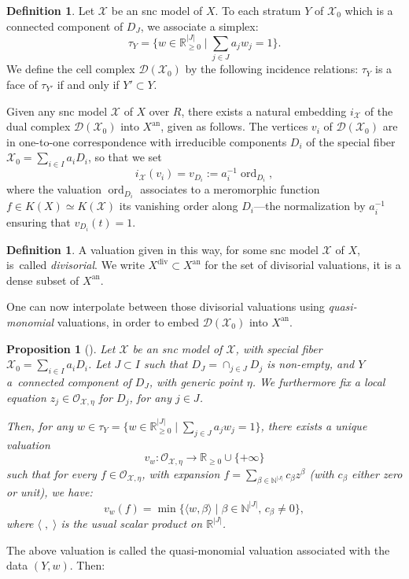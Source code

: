 \documentclass[JEP,XML,SOM,Unicode,published]{cedram}
\let\sep\mid
\newtheorem{prop}[equation]{Proposition}
\theoremstyle{definition}
\newtheorem{defn}[equation]{Definition}
\newcommand \N{\mathbb N}
\newcommand \R{\mathbb R}
\newcommand \gO {\mathcal O}
\newcommand \X {\mathscr{X}}
\newcommand{\an}{\mathrm{an}}
\DeclareMathOperator{\ord}{ord}
\DeclareMathOperator{\xdiv}{div}
\begin{document}
\begin{defn} \label{def dual cpx}
Let $\X$ be an snc model of $X$.
To each stratum $Y$ of $\X_0$ which is a connected component of $D_J$, we associate a simplex:
\[
\textstyle
\tau_Y = \bigl\{ w \in \R_{\geqslant 0}^{|J|} \sep \sum_{j \in J} a_j w_j =1 \bigr\}.
\]
We define the cell complex $\mathcal{D}(\X_0)$ by the following incidence relations: $\tau_Y$ is a face of $\tau_{Y'}$ if and only if $Y' \subset Y$.
\end{defn}
Given any snc model $\X$ of $X$ over $R$, there exists a natural embedding $i_{\X}$ of the dual complex $\mathcal{D}(\X_0)$ into $X^{\an}$, given as follows.
The vertices $v_i$ of $\mathcal{D}(\X_0)$ are in one-to-one correspondence with irreducible components $D_i$ of the special fiber $\X_0 = \sum_{i \in I} a_i D_i$, so that we set \[
i_{\X}(v_{i}) = v_{D_i}:= a^{-1}_i \ord_{D_i},
\] where the valuation $\ord_{D_i}$ associates to a meromorphic function $f \in K(X) \simeq K(\X)$ its vanishing order along $D_i$---the normalization by $a^{-1}_i$ ensuring that $v_{D_i}(t) = 1$.
\begin{defn} A valuation given in this way, for some snc model $\X$ of $X$, is~called \emph{divisorial}. We write $X^{\xdiv} \subset X^{\an}$ for the set of divisorial valuations, it is a dense subset of $X^{\an}$.
\end{defn}
One can now interpolate between those divisorial valuations using \emph{quasi-monomial} valuations, in order to embed $\mathcal{D}(\X_0)$ into $X^{\an}$.
\begin{prop}[{\cite[Prop.\,2.4.4]{MN}}] \label{prop casi mono}
Let $\X$ be an snc model of $\X$, with special fiber $\X_0 = \sum_{i \in I} a_i D_i$.
Let $J \subset I$ such that $D_J = \cap_{j \in J} D_j$ is non-empty, and $Y$ a~con\-nected component of $D_J$, with generic point $\eta$.
We furthermore fix a local equation $z_j \in \gO_{\X,\eta}$ for $D_j$, for any $j \in J$.

Then, for any $w \in \tau_Y = \{ w \in \R^{|J|}_{\geqslant 0} \sep \sum_{j \in J} a_j w_j =1 \}$, there exists a unique valuation
\[
v_w: \gO_{\X,\eta} \to \R_{\geqslant 0} \cup \{ + \infty\}
\]
such that for every $f \in \gO_{\X,\eta}$, with expansion $f = \sum_{\beta \in \N^{|J|}} c_{\beta} z^{\beta}$ (with $c_{\beta}$ either zero or unit), we have:
\[
v_w(f) = \min \{ \langle w , \beta \rangle \sep \beta \in \N^{|J|},\, c_{\beta} \neq 0 \},
\]
where $\langle \; , \; \rangle$ is the usual scalar product on $\R^{|J|}$.
\end{prop}
The above valuation is called the quasi-monomial valuation associated with the data $(Y, w)$. Then:
\end{document}
